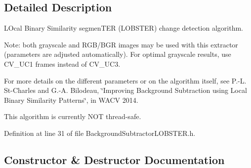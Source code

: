 \subsection{Detailed Description}
L\+Ocal Binary Similarity segmen\+T\+ER (L\+O\+B\+S\+T\+ER) change detection algorithm.

Note\+: both grayscale and R\+G\+B/\+B\+GR images may be used with this extractor (parameters are adjusted automatically). For optimal grayscale results, use C\+V\+\_\+U\+C1 frames instead of C\+V\+\_\+U\+C3.

For more details on the different parameters or on the algorithm itself, see P.-\/L. St-\/\+Charles and G.-\/A. Bilodeau, \char`\"{}\+Improving Background Subtraction using Local Binary Similarity Patterns\char`\"{}, in W\+A\+CV 2014.

This algorithm is currently N\+OT thread-\/safe. 

Definition at line 31 of file Background\+Subtractor\+L\+O\+B\+S\+T\+E\+R.\+h.



\subsection{Constructor \& Destructor Documentation}
\mbox{\label{class_background_subtractor_l_o_b_s_t_e_r_a5a09b9ca80e50ba2f8686aaee6d461b7}} 
